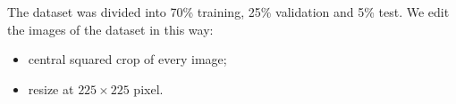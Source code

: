 The dataset was divided into 70\% training, 25\% validation and 5\% test.
We edit the images of the dataset in this way:

\begin{itemize}
	\item central squared crop of every image;
	\item resize at $225 \times 225$ pixel.
\end{itemize}




